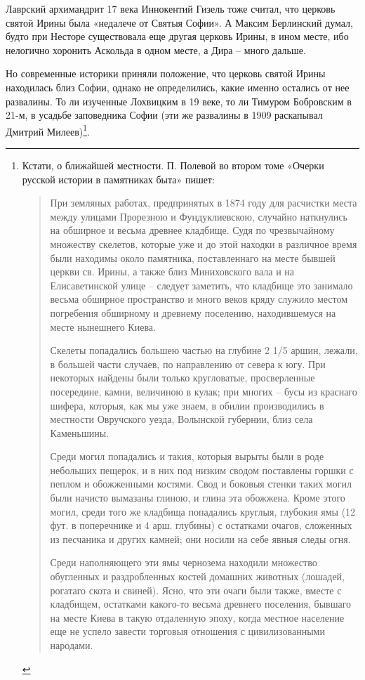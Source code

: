 Лаврский архимандрит 17 века Иннокентий Гизель тоже считал, что церковь святой Ирины была «недалече от Святыя Софии». А Максим Берлинский думал, будто при Несторе существовала еще другая церковь Ирины, в ином месте, ибо нелогично хоронить Аскольда в одном месте, а Дира – много дальше.

Но современные историки приняли положение, что церковь святой Ирины находилась близ Софии, однако не определились, какие именно остались от нее развалины. То ли изученные Лохвицким в 19 веке, то ли Тимуром Бобровским в 21-м, в усадьбе заповедника Софии (эти же развалины в 1909 раскапывал Дмитрий Милеев)\footnote{Кстати, о ближайшей местности. П. Полевой во втором томе «Очерки русской истории в памятниках быта» пишет\cite[стр. 6]{polevoy01}:

\begin{quotation}
При земляных работах, предпринятых в 1874 году для расчистки места между улицами Прорезною и Фундуклиевскою, случайно наткнулись на обширное и весьма древнее кладбище. Судя по чрезвычайному множеству скелетов, которые уже и до этой находки в различное время были находимы около памятника, поставленнаго на месте бывшей церкви св. Ирины, а также близ Миниховского вала и на Елисаветинской улице – следует заметить, что кладбище это занимало весьма обширное пространство и много веков кряду служило местом погребения обширному и древнему поселению, находившемуся на месте нынешнего Киева.

Скелеты попадались большею частью на глубине 2 1/5 аршин, лежали, в большей части случаев, по направлению от севера к югу. При некоторых найдены были только кругловатые, просверленные посередине, камни, величиною в кулак; при многих – бусы из краснаго шифера, которыя, как мы уже знаем, в обилии производились в местности Овручского уезда, Волынской губернии, близ села Каменьшины. 

Среди могил попадались и такия, которыя вырыты были в роде небольших пещерок, и в них под низким сводом поставлены горшки с пеплом и обожженными костями. Свод и боковыя стенки таких могил были начисто вымазаны глиною, и глина эта обожжена. Кроме этого могил, среди того же кладбища попадались круглыя, глубокия ямы (12 фут. в поперечнике и 4 арш. глубины) с остатками очагов, сложенных из песчаника и других камней; они носили на себе явныя следы огня. 

Среди наполняющего эти ямы чернозема находили множество обугленных и раздробленных костей домашних животных (лошадей, рогатаго скота и свиней). Ясно, что эти очаги были также, вместе с кладбищем, остатками какого-то весьма древнего поселения, бывшаго на месте Киева в такую отдаленную эпоху, когда местное население еще не успело завести торговыя отношения с цивилизованными народами.
\end{quotation}}.

